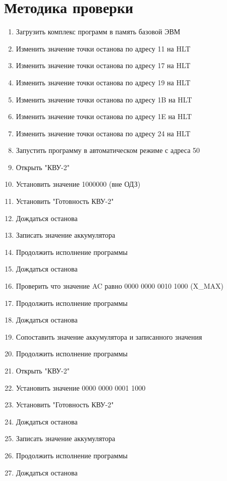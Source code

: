 \documentclass[12pt]{article}
\begin{document}
	\section{Методика проверки}
	\begin{enumerate}[]
		\item Загрузить комплекс программ в память базовой ЭВМ
        \item Изменить значение точки останова по адресу 11 на HLT
		\item Изменить значение точки останова по адресу 17 на HLT
        \item Изменить значение точки останова по адресу 19 на HLT
		\item Изменить значение точки останова по адресу 1B на HLT
  	\item Изменить значение точки останова по адресу 1E на HLT
   	\item Изменить значение точки останова по адресу 24 на HLT
		\item Запустить программу в автоматическом режиме с адреса 50
		\item Открыть "КВУ-2"
		\item Установить значение 1000000 (вне ОДЗ)
		\item Установить "Готовность КВУ-2"
		\item Дождаться останова
  	\item Записать значение аккумулятора
        \item Продолжить исполнение программы
        \item Дождаться останова
		\item Проверить что значение AC равно 0000 0000 0010 1000 (X\_MAX)
		\item Продолжить исполнение программы
        \item Дождаться останова
        \item Сопоставить значение аккумулятора и записанного значения
        \item Продолжить исполнение программы
		\item Открыть "КВУ-2"
		\item Установить значение 0000 0000 0001 1000
		\item Установить "Готовность КВУ-2"
		\item Дождаться останова
  	\item Записать значение аккумулятора
        \item Продолжить исполнение программы
        \item Дождаться останова

\end{enumerate}
\end{document}
